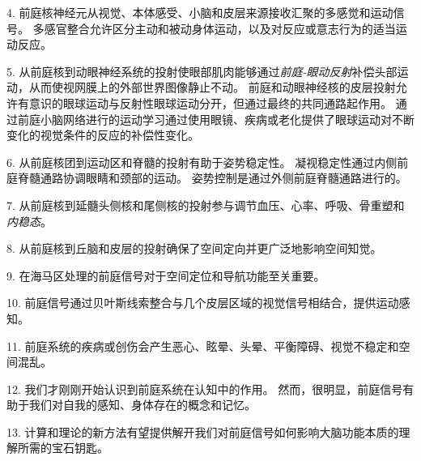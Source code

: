 4. 前庭核神经元从视觉、本体感受、小脑和皮层来源接收汇聚的多感觉和运动信号。
多感官整合允许区分主动和被动身体运动，以及对反应或意志行为的适当运动反应。


5. 从前庭核到动眼神经系统的投射使眼部肌肉能够通过\textit{前庭-眼动反射}补偿头部运动，从而使视网膜上的外部世界图像静止不动。
前庭和动眼神经核的皮层投射允许有意识的眼球运动与反射性眼球运动分开，但通过最终的共同通路起作用。
通过前庭小脑网络进行的运动学习通过使用眼镜、疾病或老化提供了眼球运动对不断变化的视觉条件的反应的补偿性变化。


6. 从前庭核团到运动区和脊髓的投射有助于姿势稳定性。
凝视稳定性通过内侧前庭脊髓通路协调眼睛和颈部的运动。
姿势控制是通过外侧前庭脊髓通路进行的。


7. 从前庭核到延髓头侧核和尾侧核的投射参与调节血压、心率、呼吸、骨重塑和\textit{内稳态}。


8. 从前庭核到丘脑和皮层的投射确保了空间定向并更广泛地影响空间知觉。


9. 在海马区处理的前庭信号对于空间定位和导航功能至关重要。


10. 前庭信号通过贝叶斯线索整合与几个皮层区域的视觉信号相结合，提供运动感知。


11. 前庭系统的疾病或创伤会产生恶心、眩晕、头晕、平衡障碍、视觉不稳定和空间混乱。


12. 我们才刚刚开始认识到前庭系统在认知中的作用。 然而，很明显，前庭信号有助于我们对自我的感知、身体存在的概念和记忆。


13. 计算和理论的新方法有望提供解开我们对前庭信号如何影响大脑功能本质的理解所需的宝石钥匙。




